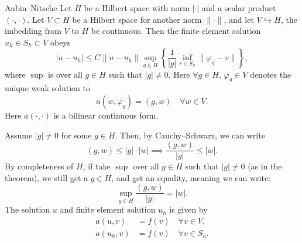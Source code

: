 \begin{thmx}{Aubin–Nitsche}
    Let $H$ be a Hilbert space with norm $|\cdot|$ and a scalar product $(\cdot,\cdot)$.
    Let $V\subset H$ be a Hilbert space for another norm $\|\cdot\|$, and let 
    $V \hookrightarrow H$, the imbedding from $V$ to $H$ be continuous.
    Then the finite element solution $u_h\in S_h \subset V$ obeys
    \begin{equation*}
        |u-u_h| \leq C \|u-u_h\| \sup_{g\in H} \left \{ \frac{1}{|g|} \inf_{v \in S_h} \|\varphi_g - v\| \right \},
    \end{equation*}
    where $\sup$ is over all $g\in H$ such that $|g|\neq 0$.
    Here $\forall g \in H$, $\varphi_g \in V$ denotes the unique weak solution to 
    \begin{equation*}
        a(w,\varphi_g) = (g,w) \quad \forall w\in V.
    \end{equation*}
    Here $a(\cdot,\cdot)$ is a bilinear continuous form.
\end{thmx}
\begin{bev}
    Assume $|g|\neq 0$ for some $g\in H$. Then,
    by Cauchy–Schwarz, we can write 
    \begin{equation*}
        (g,w) \leq |g| \cdot |w| \implies \frac{(g,w)}{|g|} \leq |w|.
    \end{equation*}
    By completeness of $H$, if take $\sup$ over all $g\in H$ such that 
    $|g|\neq 0$ (as in the theorem), we still get a $g\in H$, and get 
    an equality, meaning we can write:
    \begin{equation*}
        \sup_{g\in H} \frac{(g,w)}{|g|} = |w|.
    \end{equation*}
    The solution $u$ and finite element solution $u_h$ is given by 
    \begin{align*}
        a(u,v) &= f(v) \quad \forall v \in V, \\
        a(u_h,v) &= f(v) \quad \forall v \in S_h.
    \end{align*}
\end{bev}